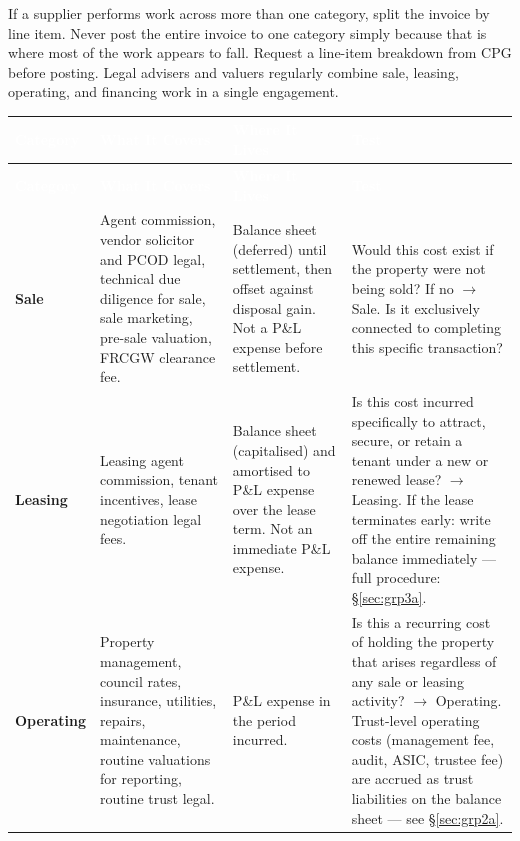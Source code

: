 \documentclass[10pt,a4paper]{article}
\begin{document}
\begin{warning}
If a supplier performs work across more than one category, split the invoice by line item. Never post the entire invoice to one category simply because that is where most of the work appears to fall. Request a line-item breakdown from CPG before posting. Legal advisers and valuers regularly combine sale, leasing, operating, and financing work in a single engagement.
\end{warning}

{\small\sffamily
\begin{longtable}{@{} L{2.2cm} L{3.0cm} L{2.8cm} L{4.7cm} @{}}
\textcolor{white}{\bfseries Category} & \textcolor{white}{\bfseries What It Covers} & \textcolor{white}{\bfseries Where It Lives} & \textcolor{white}{\bfseries Test} \\
\midrule
\endfirsthead
{}\textcolor{white}{\bfseries Category} & \textcolor{white}{\bfseries What It Covers} & \textcolor{white}{\bfseries Where It Lives} & \textcolor{white}{\bfseries Test} \\
\midrule
\endhead
\textbf{Sale} & Agent commission, vendor solicitor and PCOD legal, technical due diligence for sale, sale marketing, pre-sale valuation, FRCGW clearance fee. & Balance sheet (deferred) until settlement, then offset against disposal gain. Not a P\&L expense before settlement. & Would this cost exist if the property were not being sold? If no $\to$ Sale. Is it exclusively connected to completing this specific transaction? \\
\textbf{Leasing} & Leasing agent commission, tenant incentives, lease negotiation legal fees. & Balance sheet (capitalised) and amortised to P\&L expense over the lease term. Not an immediate P\&L expense. & Is this cost incurred specifically to attract, secure, or retain a tenant under a new or renewed lease? $\to$ Leasing. If the lease terminates early: write off the entire remaining balance immediately --- full procedure: \S\ref{sec:grp3a}. \\
\textbf{Operating} & Property management, council rates, insurance, utilities, repairs, maintenance, routine valuations for reporting, routine trust legal. & P\&L expense in the period incurred. & Is this a recurring cost of holding the property that arises regardless of any sale or leasing activity? $\to$ Operating. Trust-level operating costs (management fee, audit, ASIC, trustee fee) are accrued as trust liabilities on the balance sheet --- see \S\ref{sec:grp2a}. \\

\end{longtable}}
\end{document}
